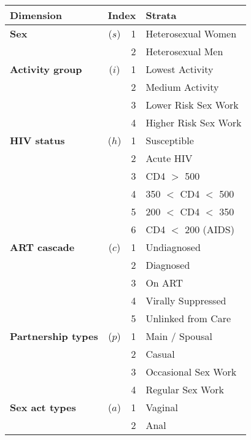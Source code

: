 \begin{tabular}{lccl}
  \toprule
  Dimension                  & \multicolumn{2}{c}{Index} & Strata \\
  \midrule
  \textbf{Sex}               & ($s$) & 1 & Heterosexual Women    \\
                             &       & 2 & Heterosexual Men      \\[1ex]
  \textbf{Activity group}    & ($i$) & 1 & Lowest Activity       \\
                             &       & 2 & Medium Activity       \\
                             &       & 3 & Lower Risk Sex Work   \\
                             &       & 4 & Higher Risk Sex Work  \\[1ex]
  \textbf{HIV status}        & ($h$) & 1 & Susceptible           \\
                             &       & 2 & Acute HIV             \\
                             &       & 3 & CD4 $>$ 500           \\
                             &       & 4 & 350 $<$ CD4 $<$ 500   \\
                             &       & 5 & 200 $<$ CD4 $<$ 350   \\
                             &       & 6 & CD4 $<$ 200 (AIDS)    \\[1ex]
  \textbf{ART cascade}       & ($c$) & 1 & Undiagnosed           \\
                             &       & 2 & Diagnosed             \\
                             &       & 3 & On ART                \\
                             &       & 4 & Virally Suppressed    \\
                             &       & 5 & Unlinked from Care    \\[1ex] %
  \textbf{Partnership types} & ($p$) & 1 & Main / Spousal        \\
                             &       & 2 & Casual                \\
                             &       & 3 & Occasional Sex Work   \\
                             &       & 4 & Regular Sex Work      \\[1ex]
  \textbf{Sex act types}     & ($a$) & 1 & Vaginal               \\
                             &       & 2 & Anal                  \\
  \bottomrule
\end{tabular}